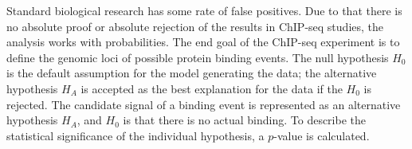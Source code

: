 







Standard biological research has some rate of false positives. 
Due to that there is no absolute proof or absolute rejection of the results in ChIP-seq studies, the analysis works with probabilities.
The end goal of the ChIP-seq experiment is to define the genomic loci of possible protein binding events. 
The null hypothesis $H_{0}$ is the default assumption for the model generating the data; the alternative hypothesis $H_{A}$ is accepted as the best explanation for the data if the $H_{0}$ is rejected.
The candidate signal of a binding event is represented as an alternative hypothesis $H_{A}$, and $H_{0}$ is that there is no actual binding. 
To describe the statistical significance of the individual hypothesis, a $p$-value is calculated.

